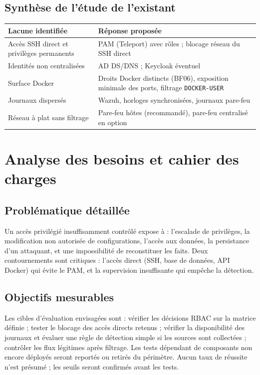 \documentclass[11pt,a4paper]{report}
\begin{document}
\section{Synthèse de l'étude de l'existant}
\begin{longtable}{@{}p{5cm}p{10.8cm}@{}}
\toprule\textbf{Lacune identifiée} & \textbf{Réponse proposée}\\ \midrule\endhead
Accès SSH direct et privilèges permanents & PAM (Teleport) avec rôles ; blocage réseau du SSH direct\\
Identités non centralisées & AD DS/DNS ; Keycloak éventuel\\
Surface Docker & Droits Docker distincts (BF06), exposition minimale des ports, filtrage \texttt{DOCKER-USER}\\
Journaux dispersés & Wazuh, horloges synchronisées, journaux pare-feu\\
Réseau à plat sans filtrage & Pare-feu hôtes (recommandé), pare-feu centralisé en option\\
\bottomrule
\end{longtable}

\chapter{Analyse des besoins et cahier des charges}

\section{Problématique détaillée}
Un accès privilégié insuffisamment contrôlé expose à : l'escalade de privilèges, la modification non autorisée de configurations, l'accès aux données, la persistance d'un attaquant, et une impossibilité de reconstituer les faits. Deux contournements sont critiques : l'accès direct (SSH, base de données, API Docker) qui évite le PAM, et la supervision insuffisante qui empêche la détection.

\section{Objectifs mesurables}
Les cibles d'évaluation envisagées sont : vérifier les décisions RBAC sur la matrice définie ; tester le blocage des accès directs retenus ; vérifier la disponibilité des journaux et évaluer une règle de détection simple si les sources sont collectées ; contrôler les flux légitimes après filtrage. Les tests dépendant de composants non encore déployés seront reportés ou retirés du périmètre. Aucun taux de réussite n'est présumé ; les seuils seront confirmés avant les tests.
\end{document}
